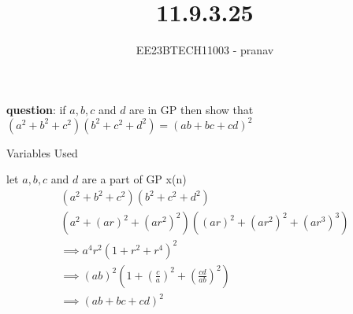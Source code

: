 \documentclass[journal,12pt,twocolumn]{IEEEtran}
\theoremstyle{remark}
\begin{document}

\vspace{3cm}

\title{11.9.3.25}
\author{EE23BTECH11003 - pranav}
\maketitle
\newpage

\bigskip
\renewcommand{\thefigure}{\arabic{figure}}
\renewcommand{\thetable}{\arabic{table}}
\textbf{question}:
if $a,b,c$ and $d$ are in GP then show that $(a^{2}+b^{2}+c^{2})(b^{2}+c^{2}+d^{2})=(ab+bc+cd)^{2}$\\
\solution
\begin{table}[h]
    \centering
    
    \caption{Variables Used}
    \label{tab:11.9.3.25}
\end{table}
let  $a,b,c$ and $d$ are a part of GP x(n)
\begin{align}
 ( a^{2}+b^{2}+c^{2})(b^{2}+c^{2}+d^{2}) \\
  (a^2+(ar)^2+(ar^2)^2)((ar)^2+(ar^2)^2+(ar^3)^3)\\
  \implies a^4r^2(1+r^2+r^4)^2\\
  \implies (ab)^2(1+(\frac{c}{a})^2+(\frac{cd}{ab})^2)\\
  \implies (ab+bc+cd)^2
\end{align}
\end{document}
